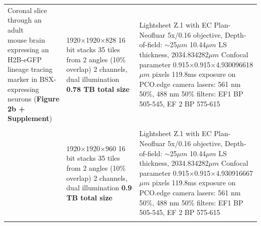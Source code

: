 \documentclass[]{spie}  %
\begin{document}
\begin{landscape}
{\begin{longtable}{lll}
 \multirowcell{2}[-4ex][l]{Coronal slice through an adult \\mouse brain expressing an H2B-eGFP \\lineage tracing marker in BSX-expressing \\neurons (\textbf{Figure 2b + Supplement})} &            \makecell[l]{1920$\times$1920$\times$828 16 bit stacks\\35 tiles from 2 angles (10\% overlap) \\2 channels, dual illumination\\\textbf{0.78 TB total size}}  &                                                                    \makecell[l]{Lightsheet Z.1 with EC Plan-Neofluar 5x/0.16 objective, Depth-of-field: $\sim$25$\mu{}m$ \\10.44$\mu{}m$ LS thickness, 2034.834282$\mu{}m$ Confocal parameter\\0.915$\times$0.915$\times$4.930096618$\mu{}m$ pixels\\119.8ms exposure on PCO.edge camera\\lasers: 561 nm 50\%, 488 nm 50\%\\filters: EF1 BP 505-545, EF 2 BP 575-615} \\ \\
                                                                                                                                    &             \makecell[l]{1920$\times$1920$\times$960 16 bit stacks\\35 tiles from 2 angles (10\% overlap) \\2 channels, dual illumination\\\textbf{0.9 TB total size}}  &                                                                    \makecell[l]{Lightsheet Z.1 with EC Plan-Neofluar 5x/0.16 objective, Depth-of-field: $\sim$25$\mu{}m$ \\10.44$\mu{}m$ LS thickness, 2034.834282$\mu{}m$ Confocal parameter\\0.915$\times$0.915$\times$4.930916667$\mu{}m$ pixels\\119.8ms exposure on PCO.edge camera\\lasers: 561 nm 50\%, 488 nm 50\%\\filters: EF1 BP 505-545, EF 2 BP 575-615} \\ \\


\end{longtable}}
\end{landscape}
\end{document}
